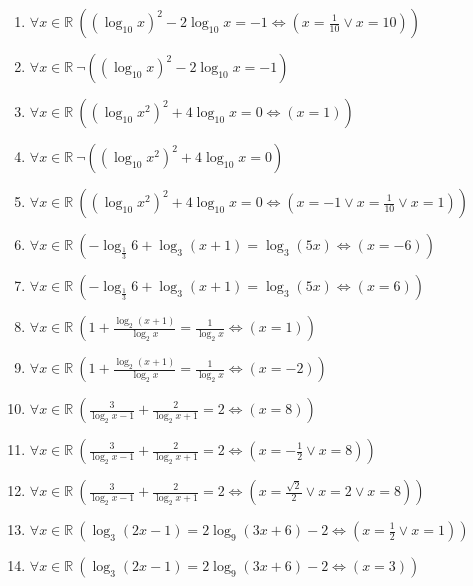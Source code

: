 \documentclass[11pt,a4paper]{article}
\begin{document}
\begin{enumerate}
\item $\displaystyle \forall x \in \mathbb{R}\ \left( \left(\log_{10} x\right)^{2} - 2\log_{10} x = -1 \iff \left( x = \frac{1}{10} \lor x = 10 \right) \right)$
\item $\displaystyle \forall x \in \mathbb{R}\ \lnot \left( \left(\log_{10} x\right)^{2} - 2\log_{10} x = -1 \right)$
\item $\displaystyle \forall x \in \mathbb{R}\ \left( \left(\log_{10} x^{2}\right)^{2} + 4\log_{10} x = 0 \iff \left( x = 1 \right) \right)$
\item $\displaystyle \forall x \in \mathbb{R}\ \lnot \left( \left(\log_{10} x^{2}\right)^{2} + 4\log_{10} x = 0 \right)$
\item $\displaystyle \forall x \in \mathbb{R}\ \left( \left(\log_{10} x^{2}\right)^{2} + 4\log_{10} x = 0 \iff \left( x = -1 \lor x = \frac{1}{10} \lor x = 1 \right) \right)$
\item $\displaystyle \forall x \in \mathbb{R}\ \left( -\log_{\frac{1}{3}} 6 + \log_{3}(x + 1) = \log_{3}(5x) \iff \left( x = -6 \right) \right)$
\item $\displaystyle \forall x \in \mathbb{R}\ \left( -\log_{\frac{1}{3}} 6 + \log_{3}(x + 1) = \log_{3}(5x) \iff \left( x = 6 \right) \right)$
\item $\displaystyle \forall x \in \mathbb{R}\ \left( 1 + \frac{\log_{2}(x + 1)}{\log_{2} x} = \frac{1}{\log_{2} x} \iff \left( x = 1 \right) \right)$
\item $\displaystyle \forall x \in \mathbb{R}\ \left( 1 + \frac{\log_{2}(x + 1)}{\log_{2} x} = \frac{1}{\log_{2} x} \iff \left( x = -2 \right) \right)$
\item $\displaystyle \forall x \in \mathbb{R}\ \left( \frac{3}{\log_{2} x - 1} + \frac{2}{\log_{2} x + 1} = 2 \iff \left( x = 8 \right) \right)$
\item $\displaystyle \forall x \in \mathbb{R}\ \left( \frac{3}{\log_{2} x - 1} + \frac{2}{\log_{2} x + 1} = 2 \iff \left( x = -\frac{1}{2} \lor x = 8 \right) \right)$
\item $\displaystyle \forall x \in \mathbb{R}\ \left( \frac{3}{\log_{2} x - 1} + \frac{2}{\log_{2} x + 1} = 2 \iff \left( x = \frac{\sqrt{2}}{2} \lor x = 2 \lor x = 8 \right) \right)$
\item $\displaystyle \forall x \in \mathbb{R}\ \left( \log_{3}(2x - 1) = 2\log_{9}(3x + 6) - 2 \iff \left( x = \frac{1}{2} \lor x = 1 \right) \right)$
\item $\displaystyle \forall x \in \mathbb{R}\ \left( \log_{3}(2x - 1) = 2\log_{9}(3x + 6) - 2 \iff \left( x = 3 \right) \right)$

\end{enumerate}
\end{document}
